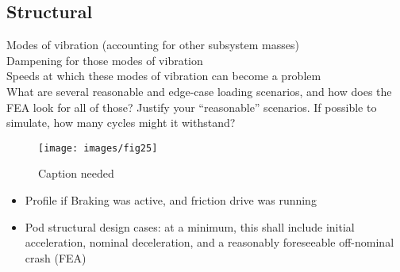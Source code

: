 \documentclass[main.tex]{subfiles}
\begin{document}
    \subsection{Structural}
    Modes of vibration (accounting for other subsystem masses)\\
    Dampening for those modes of vibration\\
    Speeds at which these modes of vibration can become a problem\\
    What are several reasonable and edge-case loading scenarios, and how does the FEA look for all of those? Justify your “reasonable” scenarios. If possible to simulate, how many cycles might it withstand?
    \begin{figure}[H]
        \centering
        \texttt{[image: images/fig25]}
        \caption{Caption needed}
    \end{figure}
    \begin{itemize}
        \item Profile if Braking was active, and friction drive was running
        \item Pod structural design cases: at a minimum, this shall include initial acceleration, nominal deceleration, and a reasonably foreseeable off-nominal crash (FEA)
    \end{itemize}
\end{document}

